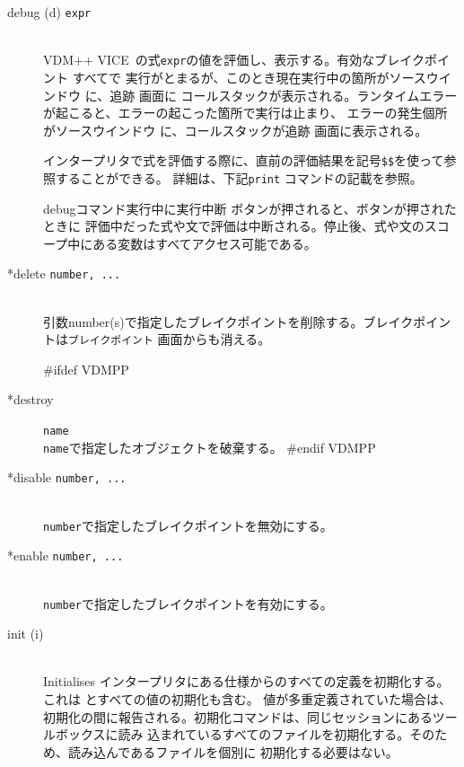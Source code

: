 \documentclass[\pformat,12pt]{article}
\newcommand{\vdmslpp}{VDM-SL}
\newcommand{\vdmslpp}{VDM++}
\renewcommand{\vdmslpp}{VDM++ VICE}
\newcommand{\guicmd}[1]{{\sf #1}}
\newcommand{\guicmd}[1]{{\gt #1}}
\begin{document}
\begin{description}
\item[debug (d) {\tt expr}]\mbox{}\\
  \vdmslpp\ の式{\tt expr}の値を評価し、表示する。有効なブレイクポイント すべてで
  実行がとまるが、このとき現在実行中の箇所が\guicmd{ソースウインドウ} に、\guicmd{追跡} 画面に
  コールスタックが表示される。ランタイムエラーが起こると、エラーの起こった箇所で実行は止まり、
  エラーの発生個所が\guicmd{ソースウインドウ} に、コールスタックが\guicmd{追跡} 画面に表示される。
  
  インタープリタで式を評価する際に、直前の評価結果を記号{\tt \$\$}\index{\$\$}を使って参照することができる。
  詳細は、下記{\tt print} コマンドの記載を参照。
  
  debugコマンド実行中に\guicmd{実行中断} ボタンが押されると、ボタンが押されたときに
  評価中だった式や文で評価は中断される。停止後、式や文のスコープ中にある変数はすべてアクセス可能である。
  
\item[*delete {\tt number, ...}] 
\mbox{}\\
  引数number(s)で指定したブレイクポイントを削除する。ブレイクポイントは\texttt{ブレイクポイント} 画面からも消える。
  
#ifdef VDMPP
\item[*destroy] {\tt name}\mbox{}\\
  {\tt name}で指定したオブジェクトを破棄する。
#endif VDMPP

\item[*disable \texttt{number, ...}]
\mbox{}\\
  \texttt{number}で指定したブレイクポイントを無効にする。

\item[*enable \texttt{number, ...}]
\mbox{}\\
  \texttt{number}で指定したブレイクポイントを有効にする。
 
\item[init (i)] \mbox{}\\ Initialises
  インタープリタにある仕様からのすべての定義を初期化する。%
  これは%
   とすべての値の初期化も含む。%
  値が多重定義されていた場合は、%
  初期化の間に報告される。初期化コマンドは、同じセッションにあるツールボックスに読み%
  込まれているすべてのファイルを初期化する。そのため、読み込んであるファイルを個別に%
  初期化する必要はない。
  

\end{description}
\end{document}
